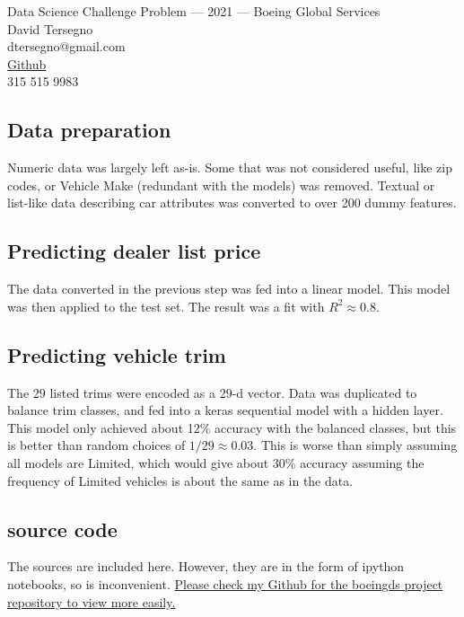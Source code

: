\documentclass{amsart}
\begin{document}
	
	\large 
	\noindent Data Science Challenge Problem --- 2021 --- Boeing Global Services\\
	
	\noindent David Tersegno\\
	dtersegno@gmail.com\\
	\href{https://github.com/dtersegno}{Github}\\
	315 515 9983
	
	\subsection*{Data preparation} Numeric data was largely left as-is. Some that was not considered useful, like zip codes, or Vehicle Make (redundant with the models) was removed. Textual or list-like data describing car attributes was converted to over 200 dummy features.
	
	\subsection*{Predicting dealer list price} The data converted in the previous step was fed into a linear model. This model was then applied to the test set. The result was a fit with $R^2 \approx 0.8$.
	
	\subsection*{Predicting vehicle trim} The 29 listed trims were encoded as a 29-d vector. Data was duplicated to balance trim classes, and fed into a keras sequential model with a hidden layer. This model only achieved about 12\% accuracy with the balanced classes, but this is better than random choices of $1/29 \approx 0.03$. This is worse than simply assuming all models are Limited, which would give about 30\% accuracy assuming the frequency of Limited vehicles is about the same as in the data.
	\subsection*{source code} The sources are included here. However, they are in the form of ipython notebooks, so is inconvenient. \href{https://github.com/dtersegno/boeingds}{Please check my Github for the boeingds project repository to view more easily.}\\
	
	
	
	
\end{document}
